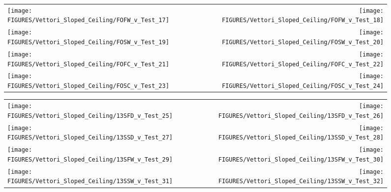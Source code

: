 \begin{figure}[p]
\begin{tabular*}{\textwidth}{l@{\extracolsep{\fill}}r}
\texttt{[image: FIGURES/Vettori\_Sloped\_Ceiling/FOFW\_v\_Test\_17]} &
\texttt{[image: FIGURES/Vettori\_Sloped\_Ceiling/FOFW\_v\_Test\_18]} \\
\texttt{[image: FIGURES/Vettori\_Sloped\_Ceiling/FOSW\_v\_Test\_19]} &
\texttt{[image: FIGURES/Vettori\_Sloped\_Ceiling/FOSW\_v\_Test\_20]} \\
\texttt{[image: FIGURES/Vettori\_Sloped\_Ceiling/FOFC\_v\_Test\_21]} &
\texttt{[image: FIGURES/Vettori\_Sloped\_Ceiling/FOFC\_v\_Test\_22]} \\
\texttt{[image: FIGURES/Vettori\_Sloped\_Ceiling/FOSC\_v\_Test\_23]} &
\texttt{[image: FIGURES/Vettori\_Sloped\_Ceiling/FOSC\_v\_Test\_24]} \\
\end{tabular*}
\label{Vettori_Sloped_3}
\end{figure}

\begin{figure}[p]
\begin{tabular*}{\textwidth}{l@{\extracolsep{\fill}}r}
\texttt{[image: FIGURES/Vettori\_Sloped\_Ceiling/13SFD\_v\_Test\_25]} &
\texttt{[image: FIGURES/Vettori\_Sloped\_Ceiling/13SFD\_v\_Test\_26]} \\
\texttt{[image: FIGURES/Vettori\_Sloped\_Ceiling/13SSD\_v\_Test\_27]} &
\texttt{[image: FIGURES/Vettori\_Sloped\_Ceiling/13SSD\_v\_Test\_28]} \\
\texttt{[image: FIGURES/Vettori\_Sloped\_Ceiling/13SFW\_v\_Test\_29]} &
\texttt{[image: FIGURES/Vettori\_Sloped\_Ceiling/13SFW\_v\_Test\_30]} \\
\texttt{[image: FIGURES/Vettori\_Sloped\_Ceiling/13SSW\_v\_Test\_31]} &
\texttt{[image: FIGURES/Vettori\_Sloped\_Ceiling/13SSW\_v\_Test\_32]} \\
\end{tabular*}
\label{Vettori_Sloped_4}
\end{figure}

